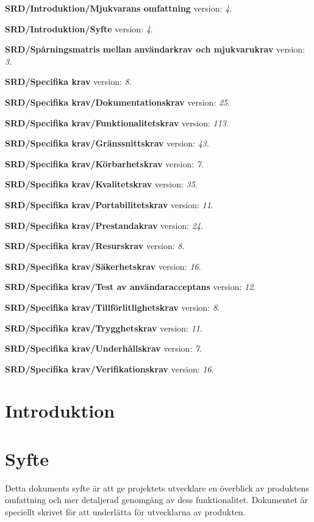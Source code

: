 \documentclass[a4paper, twoside, 11pt, titlepage]{article}
\begin{document}
\textbf{SRD/Introduktion/Mjukvarans omfattning} version: \emph{4}.

\textbf{SRD/Introduktion/Syfte} version: \emph{4}.

\textbf{SRD/Spårningsmatris mellan användarkrav och mjukvarukrav} version: \emph{3}.

\textbf{SRD/Specifika krav} version: \emph{8}.

\textbf{SRD/Specifika krav/Dokumentationskrav} version: \emph{25}.

\textbf{SRD/Specifika krav/Funktionalitetskrav} version: \emph{113}.

\textbf{SRD/Specifika krav/Gränssnittskrav} version: \emph{43}.

\textbf{SRD/Specifika krav/Körbarhetskrav} version: \emph{7}.

\textbf{SRD/Specifika krav/Kvalitetskrav} version: \emph{35}.

\textbf{SRD/Specifika krav/Portabilitetskrav} version: \emph{11}.

\textbf{SRD/Specifika krav/Prestandakrav} version: \emph{24}.

\textbf{SRD/Specifika krav/Resurskrav} version: \emph{8}.

\textbf{SRD/Specifika krav/Säkerhetskrav} version: \emph{16}.

\textbf{SRD/Specifika krav/Test av användaracceptans} version: \emph{12}.

\textbf{SRD/Specifika krav/Tillförlitlighetskrav} version: \emph{8}.

\textbf{SRD/Specifika krav/Trygghetskrav} version: \emph{11}.

\textbf{SRD/Specifika krav/Underhållskrav} version: \emph{7}.

\textbf{SRD/Specifika krav/Verifikationskrav} version: \emph{16}.

\clearpage \tableofcontents \clearpage

\clearpage
\section{Introduktion}



\clearpage
\section{Syfte}


Detta dokuments syfte är att ge projektets utvecklare en överblick av produktens omfattning och mer detaljerad genomgång av dess funktionalitet. Dokumentet är speciellt skrivet för att underlätta för utvecklarna av produkten. 
\end{document}
